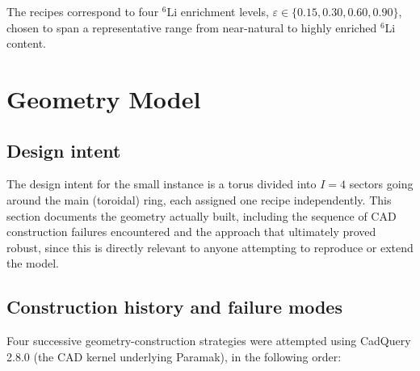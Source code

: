 \documentclass[11pt]{article}
\begin{document}
The recipes correspond to four $^6$Li enrichment levels,
$\varepsilon\in\{0.15,0.30,0.60,0.90\}$, chosen to span a representative
range from near-natural to highly enriched $^6$Li content.

\section{Geometry Model}

\subsection{Design intent}

The design intent for the small instance is a torus divided
into $I=4$ sectors going around the main (toroidal) ring, each assigned one
recipe independently. This section documents the geometry actually built,
including the sequence of CAD construction failures encountered and the
approach that ultimately proved robust, since this is directly relevant to
anyone attempting to reproduce or extend the model.

\subsection{Construction history and failure modes}
\label{sec:geom-history}

Four successive geometry-construction strategies were attempted using
CadQuery 2.8.0 (the CAD kernel underlying Paramak), in the following order:
\end{document}
